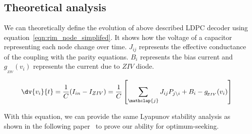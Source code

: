 \subsection{Theoretical analysis}
We can theoretically define the evolution of above described LDPC decoder using equation~\ref{eqn:rim_node_simplifed}. It shows how the voltage of a capacitor representing each node change over time. $J_{ij}$ represents the effective conductance of the coupling with the parity equations. $B_i$ represents the bias current and  $g_{\!_{ZIV}}(v_{i})$ represents the current due to $ZIV$ diode.

\begin{equation}\label{eqn:rim_node_simplifed}
\begin{split}
    \dv{v_i}{t} = \frac{1}{C}(I_{in} - I_{ZIV}) =  \frac{1}{C} \left[ \sum_{\mathclap{j}} J_{ij} P_{j\backslash i} + B_i - g_{\!_{ZIV}}(v_{i}) \right]
\end{split}
\end{equation}

With this equation, we can provide the same Lyapunov stability analysis as shown in the following paper~\cite{afoakwa.hpca21} to prove our ability for optimum-seeking.


